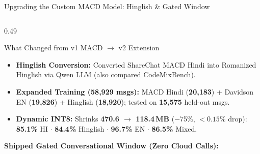 \documentclass[aspectratio=169,10pt]{beamer}
\begin{document}
\begin{frame}{Upgrading the Custom MACD Model: Hinglish \& Gated Window}
  \begin{columns}[T]
    \begin{column}{0.49\textwidth}
      \begin{softcard}[snBlue!50]{What Changed from v1 MACD $\rightarrow$ v2 Extension}
        \scriptsize
        \begin{itemize}
          \setlength\itemsep{3.2pt}
          \item \textbf{Hinglish Conversion:} Converted ShareChat MACD Hindi into Romanized Hinglish via Qwen LLM (also compared CodeMixBench).
          \item \textbf{Expanded Training (58{,}929 msgs):} MACD Hindi (\textbf{20{,}183}) + Davidson EN (\textbf{19{,}826}) + Hinglish (\textbf{18{,}920}); tested on \textbf{15{,}575} held-out msgs.
          \item \textbf{Dynamic INT8:} Shrinks \textbf{470.6 $\rightarrow$ 118.4\,MB} ($-$75\%, $<0.15\%$ drop): \textbf{85.1\%} HI $\cdot$ \textbf{84.4\%} Hinglish $\cdot$ \textbf{96.7\%} EN $\cdot$ \textbf{86.5\%} Mixed.
        \end{itemize}
      \end{softcard}

      \vspace{0.18cm}
      \textbf{\scriptsize\color{snDark}Shipped Gated Conversational Window (Zero Cloud Calls):}\\[3pt]
\end{column}
\end{columns}
\end{frame}
\end{document}
